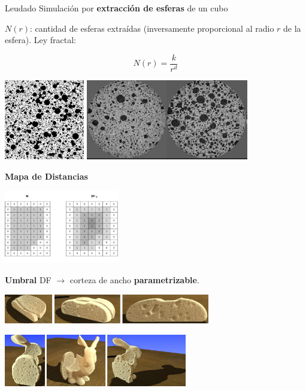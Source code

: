 \documentclass[spanish,unknownkeysallowed,10pt]{beamer}
\begin{document}
\begin{frame}{Leudado}
Simulación por \textbf{extracción de esferas} de un cubo

$N(r)$: cantidad de esferas extraídas (inversamente proporcional al radio $r$ de la esfera). Ley fractal:

\begin{equation*}
N(r) = \frac{k}{r^{d}}
\end{equation*}

\vspace{0.3cm}
\centering
\includegraphics[height=3.5cm]{../figures/bubbles}
\includegraphics[height=3.5cm]{../figures/proving}
\end{frame}

\begin{frame}
\textbf{Mapa de Distancias}
\centerline{\includegraphics[width=5cm]{../figures/DistanceTransform}}

\textbf{Umbral} DF $\rightarrow$ corteza de ancho \textbf{parametrizable}.

\vspace{0.3cm}

\centerline{\includegraphics[width=9cm]{../figures/prebakebread}}

\centerline{\includegraphics[width=8cm]{../figures/prebakebunny}}
\end{frame}
\end{document}
